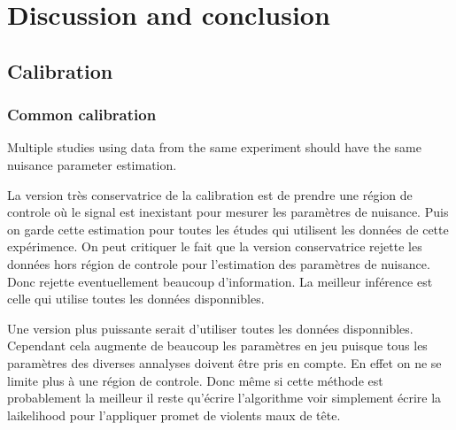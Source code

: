 \chapter{Discussion and conclusion}
\label{chap:conclusion}
\ifpdf
    \graphicspath{{Chapter6/Figs/Raster/}{Chapter6/Figs/PDF/}{Chapter6/Figs/}}
\else
    \graphicspath{{Chapter6/Figs/Vector/}{Chapter6/Figs/}}
\fi







\section{Calibration} %
\label{sec:calibration}

\subsection{Common calibration} %
\label{sub:common_calibration}


Multiple studies using data from the same experiment should have the same nuisance parameter estimation.

La version très conservatrice de la calibration est de prendre une région de controle où le signal est inexistant pour mesurer les paramètres de nuisance.
Puis on garde cette estimation pour toutes les études qui utilisent les données de cette expérimence.
On peut critiquer le fait que la version conservatrice rejette les données hors région de controle pour l'estimation des paramètres de nuisance.
Donc rejette eventuellement beaucoup d'information.
La meilleur inférence est celle qui utilise toutes les données disponnibles.

Une version plus puissante serait d'utiliser toutes les données disponnibles.
Cependant cela augmente de beaucoup les paramètres en jeu puisque tous les paramètres des diverses annalyses doivent être pris en compte.
En effet on ne se limite plus à une région de controle.
Donc même si cette méthode est probablement la meilleur il reste qu'écrire l'algorithme voir simplement écrire la laikelihood pour l'appliquer promet de violents maux de tête.

